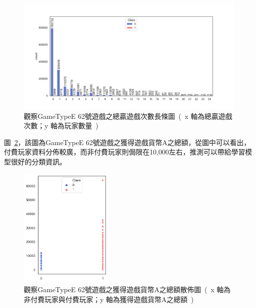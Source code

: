 \begin{figure}[!htb]
    \begin{center}
      \includegraphics[width=1\textwidth]{figures/evaluation/Image_GameTypeE62TotalWinTimes.pdf}
      \caption[觀察GameTypeE 62號遊戲之總贏遊戲次數長條圖]{觀察GameTypeE 62號遊戲之總贏遊戲次數長條圖\ (\ x 軸為總贏遊戲次數；y 軸為玩家數量\ )\ }
      \label{fig:eva_ValuableFeatureBarPlot_GameTypeE62TotalWinTimes}
    \end{center}
\end{figure}

圖~\ref{fig:eva_ValuableFeatureScatterPlot_GameTyeE62TotalCoinAAwarded}，該圖為GameTypeE 62號遊戲之獲得遊戲貨幣A之總額，從圖中可以看出，付費玩家資料分佈較廣，而非付費玩家則侷限在10,000左右，推測可以帶給學習模型很好的分類資訊。

\begin{figure}[!htb]
    \begin{center}
      \includegraphics[width=0.4\textwidth]{figures/evaluation/Image_GameTypeE62TotalCoinAAwarded.png}
      \caption[觀察GameTypeE 62號遊戲之獲得遊戲貨幣A之總額散佈圖]{觀察GameTypeE 62號遊戲之獲得遊戲貨幣A之總額散佈圖\ (\ x 軸為非付費玩家與付費玩家；y 軸為獲得遊戲貨幣A之總額\ )\ }
      \label{fig:eva_ValuableFeatureScatterPlot_GameTyeE62TotalCoinAAwarded}
    \end{center}
\end{figure}
\newpage

